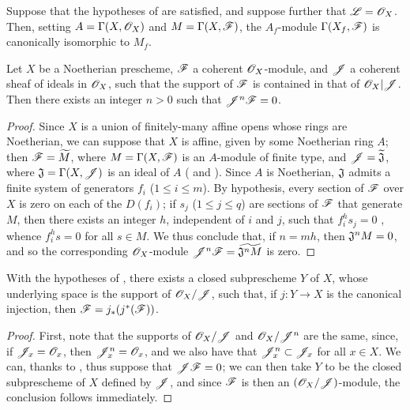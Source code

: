 \begin{corollary}[9.3.3]
\label{1.9.3.3}
Suppose that the hypotheses of  are satisfied, and suppose further that
$\mathscr{L}=\mathscr{O}_X$. Then, setting $A=\Gamma(X,\mathscr{O}_X)$ and $M=\Gamma(X,\mathscr{F})$, the $A_f$-module
$\Gamma(X_f,\mathscr{F})$ is canonically isomorphic to $M_f$.
\end{corollary}

\begin{proposition}[9.3.4]
\label{1.9.3.4}
Let $X$ be a Noetherian prescheme, $\mathscr{F}$ a coherent $\mathscr{O}_X$-module, and $\mathscr{J}$ a
coherent sheaf of ideals in $\mathscr{O}_X$, such that the support of $\mathscr{F}$ is contained in that
of $\mathscr{O}_X|\mathscr{J}$. Then there exists an integer $n>0$ such that $\mathscr{J}^n\mathscr{F}=0$.
\end{proposition}

\begin{proof}
\label{proof-1.9.3.4}
Since $X$ is a union of finitely-many affine opens whose rings are Noetherian, we can suppose
that $X$ is affine, given by some Noetherian ring $A$; then $\mathscr{F}={\widetilde{M}}$, where
$M=\Gamma(X,\mathscr{F})$ is an $A$-module of finite type, and $\mathscr{J}={\widetilde{\mathfrak{J}}}$,
where $\mathfrak{J}=\Gamma(X,\mathscr{J})$ is an ideal of $A$ ( and
). Since $A$ is Noetherian, $\mathfrak{J}$ admits a finite system of
generators $f_i$ ($1\leq i\leq m$). By hypothesis, every section of $\mathscr{F}$ over
$X$ is zero on each of the $D(f_i)$; if $s_j$ ($1\leq j\leq q$) are sections of
$\mathscr{F}$ that generate $M$, then there exists an integer $h$, independent of $i$ and $j$,
such that $f_i^h s_j=0$ , whence $f_i^h s=0$ for all $s\in M$. We thus
conclude that, if $n=mh$, then $\mathfrak{J}^n M=0$, and so the corresponding $\mathscr{O}_X$-module
$\mathscr{J}^n\mathscr{F}={\widetilde{\mathfrak{J}^n M}}$  is zero.
\end{proof}

\begin{corollary}[9.3.5]
\label{1.9.3.5}
With the hypotheses of , there exists a closed subprescheme $Y$ of $X$,
whose underlying space is the support of $\mathscr{O}_X/\mathscr{J}$, such that, if $j:Y\to X$ is the
canonical injection, then $\mathscr{F}=j_*(j^*(\mathscr{F}))$.
\end{corollary}

\begin{proof}
\label{proof-1.9.3.5}
First, note that the supports of $\mathscr{O}_X/\mathscr{J}$ and $\mathscr{O}_X/\mathscr{J}^n$ are the same,
since, if $\mathscr{J}_x=\mathscr{O}_x$, then $\mathscr{J}_x^n=\mathscr{O}_x$, and we also have that
$\mathscr{J}_x^n\subset\mathscr{J}_x$ for all $x\in X$. We can, thanks to , thus
suppose that $\mathscr{J}\mathscr{F}=0$; we can then take $Y$ to be the closed subprescheme of $X$
defined by $\mathscr{J}$, and since $\mathscr{F}$ is then an $(\mathscr{O}_X/\mathscr{J})$-module, the conclusion
follows immediately.
\end{proof}

